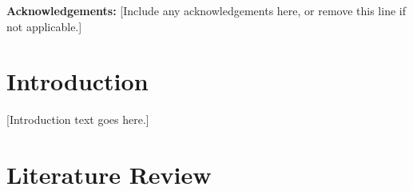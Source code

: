 \documentclass[12pt, a4paper]{article}
\begin{document}
\bigskip
\noindent\textbf{Acknowledgements:} [Include any acknowledgements here, or remove this
line if not applicable.]

\newpage

\singlespacing
\tableofcontents
\newpage

\listoffigures
\newpage

\listoftables
\newpage

\printglossary[
  type=\acronymtype,
  title={List of Abbreviations},
  toctitle={List of Abbreviations}
]
\newpage

\doublespacing

\section{Introduction}

[Introduction text goes here.]

\section{Literature Review}
\end{document}
